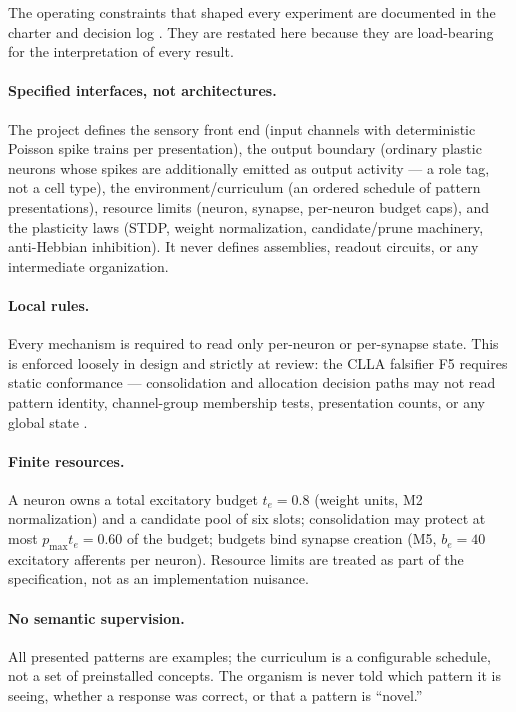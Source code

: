 The operating constraints that shaped every experiment are documented
in the charter and decision log \cite{overview,decisionlog}. They are
restated here because they are load-bearing for the interpretation of
every result.

\paragraph{Specified interfaces, not architectures.}
The project defines the sensory front end (input channels with
deterministic Poisson spike trains per presentation), the output
boundary (ordinary plastic neurons whose spikes are additionally
emitted as output activity --- a role tag, not a cell type), the
environment/curriculum (an ordered schedule of pattern presentations),
resource limits (neuron, synapse, per-neuron budget caps), and the
plasticity laws (STDP, weight normalization, candidate/prune machinery,
anti-Hebbian inhibition). It never defines assemblies, readout circuits,
or any intermediate organization.

\paragraph{Local rules.}
Every mechanism is required to read only per-neuron or per-synapse
state. This is enforced loosely in design and strictly at review: the
CLLA falsifier F5 requires static conformance --- consolidation and
allocation decision paths may not read pattern identity, channel-group
membership tests, presentation counts, or any global state
\cite{cllaprot,cllarecord}.

\paragraph{Finite resources.}
A neuron owns a total excitatory budget \(t_e = 0.8\) (weight units, M2
normalization) and a candidate pool of six slots; consolidation may
protect at most \(p_{\max} t_e = 0.60\) of the budget; budgets bind
synapse creation (M5, \(b_e = 40\) excitatory afferents per neuron).
Resource limits are treated as part of the specification, not as an
implementation nuisance.

\paragraph{No semantic supervision.}
All presented patterns are examples; the curriculum is a configurable
schedule, not a set of preinstalled concepts. The organism is never told
which pattern it is seeing, whether a response was correct, or that a
pattern is ``novel.''

